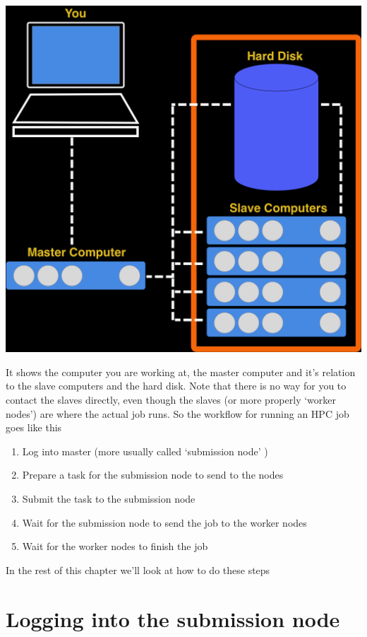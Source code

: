 \documentclass[]{book}
\providecommand{\tightlist}{%
  \setlength{\itemsep}{0pt}\setlength{\parskip}{0pt}}
\begin{document}
\includegraphics{hpc_graphic.png}

It shows the computer you are working at, the master computer and it's relation to the slave computers and the hard disk. Note that there is no way for you to contact the slaves directly, even though the slaves (or more properly `worker nodes') are where the actual job runs. So the workflow for running an HPC job goes like this

\begin{enumerate}
\def\labelenumi{\arabic{enumi}.}
\tightlist
\item
  Log into master (more usually called `submission node' )
\item
  Prepare a task for the submission node to send to the nodes
\item
  Submit the task to the submission node
\item
  Wait for the submission node to send the job to the worker nodes
\item
  Wait for the worker nodes to finish the job
\end{enumerate}

In the rest of this chapter we'll look at how to do these steps

\hypertarget{logging-into-the-submission-node}{%
\section{Logging into the submission node}\label{logging-into-the-submission-node}}
\end{document}
